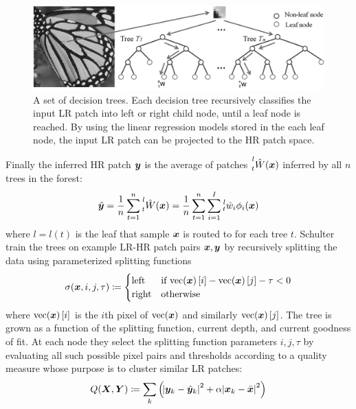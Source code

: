 \begin{figure}
    \centering
    \includegraphics[width=\linewidth,keepaspectratio]{figures/classical/FIRF.png}
    \caption{A set of decision trees. Each decision tree recursively classifies the input LR patch into left or right child node, until a leaf node is reached. By using the linear regression models stored in the each leaf node, the input LR patch can be projected to the HR patch space\cite{Huang}.}
    \label{fig:firf}
\end{figure}
%
Finally the inferred HR patch \(\bm{y}\) is the average of patches \(\prescript{l}{t}{\hat{W}(\bm{x})}\) inferred by all \(n\) trees in the forest:
\begin{equation}
    \hat{\bm{y}} = \frac{1}{n} \sum_{t=1}^{n} \prescript{l}{t}{\hat{W}(\bm{x})} =  \frac{1}{n} \sum_{t=1}^{n} \sum_{i=1}^I \prescript{l}{t}{\hat{w}_i}\phi_i(\bm{x})
\end{equation}
where \(l = l(t)\) is the leaf that sample \(\bm{x}\) is routed to for each tree \(t\).
%
Schulter \etal~ train the trees on example LR-HR patch pairs \(\bm{x}, \bm{y}\) by recursively splitting the data using parameterized splitting functions
\begin{equation}
    \sigma(\bm{x}, i, j, \tau)\coloneqq {
    \begin{cases}
        \text{left}  & \text{if } \text{vec}(\bm{x})\left[ i \right] - \text{vec}(\bm{x})\left[ j \right] - \tau < 0 \\
        \text{right} & \text{otherwise}
    \end{cases}
    }
\end{equation}
where \(\text{vec}(\bm{x})\left[ i \right]\) is the \(i\)th pixel of \(\text{vec}(\bm{x})\) and similarly \(\text{vec}(\bm{x})\left[ j \right]\).
%
The tree is grown as a function of the splitting function, current depth, and current goodness of fit.
%
At each node they select the splitting function parameters \(i, j, \tau\) by evaluating all such possible pixel pairs and thresholds according to a quality measure whose purpose is to cluster similar LR patches:
\begin{equation}
    Q(\bm{X}, \bm{Y}) \coloneqq \sum_k \left( \abs{ \bm{y}_k - \hat{\bm{y}}_k }^2 + \alpha\abs{ \bm{x}_k - \bar{\bm{x}} }^2 \right)
    \label{eqn:qualitymeasure}
\end{equation}
